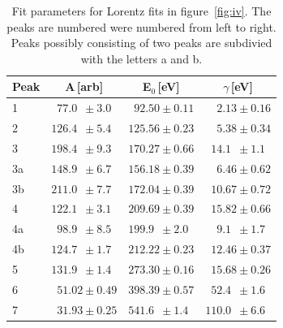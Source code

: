 \documentclass[a4paper,10pt]{scrartcl}
\begin{document}
\begin{table}
\begin{center}
\begin{tabular}{lccc}
\toprule
Peak & A\,[arb]                                        & E$_{0}$\,[eV]                         & $\gamma$\,[eV]                                  \\
\midrule 
1    & $\phantom{0}77.0\phantom{0} \pm 3.0\phantom{0}$ & $\phantom{0}92.50 \pm 0.11$           & $\phantom{00}2.13 \pm 0.16$                     \\
2    & $126.4\phantom{0} \pm 5.4\phantom{0}$           & $125.56 \pm 0.23$                     & $\phantom{00}5.38 \pm 0.34$                     \\
3    & $198.4\phantom{0} \pm 9.3\phantom{0}$           & $170.27 \pm 0.66$                     & $\phantom{0}14.1\phantom{0} \pm 1.1\phantom{0}$ \\
3a   & $148.9\phantom{0} \pm 6.7\phantom{0}$           & $156.18 \pm 0.39$                     & $\phantom{00}6.46 \pm 0.62$                     \\
3b   & $211.0\phantom{0} \pm 7.7\phantom{0}$           & $172.04 \pm 0.39$                     & $\phantom{0}10.67 \pm 0.72$                     \\
4    & $122.1\phantom{0} \pm 3.1\phantom{0}$           & $209.69 \pm 0.39$                     & $\phantom{0}15.82 \pm 0.66$                     \\
4a   & $\phantom{0}98.9\phantom{0} \pm 8.5\phantom{0}$ & $199.9\phantom{0} \pm 2.0\phantom{0}$ & $\phantom{00}9.1\phantom{0} \pm 1.7\phantom{0}$ \\
4b   & $124.7\phantom{0} \pm 1.7\phantom{0}$           & $212.22 \pm 0.23$                     & $\phantom{0}12.46 \pm 0.37$                     \\
5    & $131.9\phantom{0} \pm 1.4\phantom{0}$           & $273.30 \pm 0.16$                     & $\phantom{0}15.68 \pm 0.26$                     \\
6    & $\phantom{0}51.02 \pm 0.49$                     & $398.39 \pm 0.57$                     & $\phantom{0}52.4\phantom{0} \pm 1.6\phantom{0}$ \\
7    & $\phantom{0}31.93 \pm 0.25$                     & $541.6\phantom{0} \pm 1.4\phantom{0}$ & $110.0\phantom{0} \pm 6.6\phantom{0}$           \\  
\bottomrule
\end{tabular}
\end{center}
\par
\caption{Fit parameters for Lorentz fits in figure~\ref{fig:iv}. The peaks are numbered were numbered from left to right. Peaks possibly consisting of two peaks are subdivied with the letters a and b. \label{tab:lorentz}}
\end{table}
\end{document}
